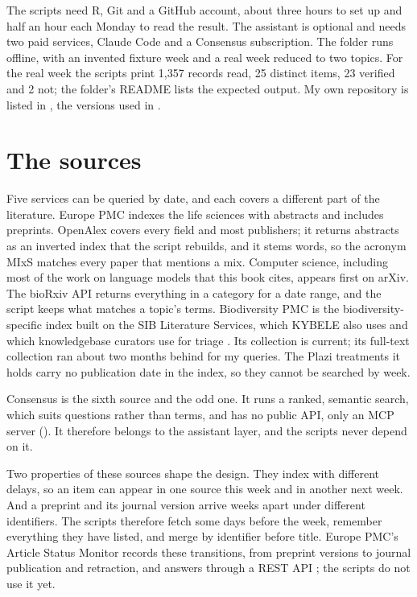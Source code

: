 The scripts need R, Git and a GitHub account, about three hours to set up and
half an hour each Monday to read the result. The assistant is optional and
needs two paid services, Claude Code and a Consensus subscription. The
 folder runs offline, with an invented fixture week
and a real week reduced to two topics. For the real week the scripts print
1,357 records read, 25 distinct items, 23 verified and 2 not; the folder's
README lists the expected output. My own repository is listed in
, the versions used in .

\section{The sources}

Five services can be queried by date, and each covers a different part of the
literature. Europe PMC indexes the life sciences with abstracts and includes
preprints. OpenAlex covers every field and most publishers; it returns
abstracts as an inverted index that the script rebuilds, and it stems words,
so the acronym MIxS matches every paper that mentions a mix. Computer
science, including most of the work on language models that this book cites,
appears first on arXiv. The bioRxiv API returns everything in a category for
a date range, and the script keeps what matches a topic's terms. Biodiversity
PMC \parencite{pasche2026biodivpmc} is the biodiversity-specific index built
on the SIB Literature Services, which KYBELE also uses and which knowledgebase
curators use for triage \parencite{pombase2026curation}. Its 
collection is current; its full-text  collection ran about two
months behind for my queries. The Plazi treatments it holds
\parencite{agosti2022treatments} carry no publication date in the index, so
they cannot be searched by week.

Consensus is the sixth source and the odd one. It runs a ranked, semantic
search, which suits questions rather than terms, and has no public API, only
an MCP server (). It therefore belongs to the assistant
layer, and the scripts never depend on it.

Two properties of these sources shape the design. They index with different
delays, so an item can appear in one source this week and in another next
week. And a preprint and its journal version arrive weeks apart under
different identifiers. The scripts therefore fetch some days before the week,
remember everything they have listed, and merge by identifier before title.
Europe PMC's Article Status Monitor records these transitions, from preprint
versions to journal publication and retraction, and answers through a REST
API \parencite{pombase2026curation}; the scripts do not use it yet.

